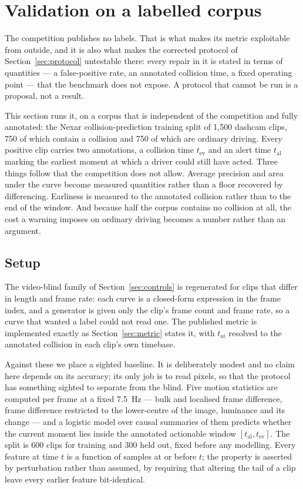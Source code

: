 \section{Validation on a labelled corpus}
\label{sec:nexar}

The competition publishes no labels. That is what makes its metric exploitable
from outside, and it is also what makes the corrected protocol of
Section~\ref{sec:protocol} untestable there: every repair in it is stated in
terms of quantities --- a false-positive rate, an annotated collision time, a
fixed operating point --- that the benchmark does not expose. A protocol that
cannot be run is a proposal, not a result.

This section runs it, on a corpus that is independent of the competition and
fully annotated: the Nexar collision-prediction training split of 1,500 dashcam
clips, 750 of which contain a collision and 750 of which are ordinary driving.
Every positive clip carries two annotations, a collision time $t_{\text{ev}}$
and an alert time $t_{\text{al}}$ marking the earliest moment at which a driver
could still have acted. Three things follow that the competition does not
allow. Average precision and area under the curve become measured quantities
rather than a floor recovered by differencing. Earliness is measured to the
annotated collision rather than to the end of the window. And because half the
corpus contains no collision at all, the cost a warning imposes on ordinary
driving becomes a number rather than an argument.

\subsection{Setup}

The video-blind family of Section~\ref{sec:controls} is regenerated for clips
that differ in length and frame rate: each curve is a closed-form expression in
the frame index, and a generator is given only the clip's frame count and frame
rate, so a curve that wanted a label could not read one. The published metric
is implemented exactly as Section~\ref{sec:metric} states it, with
$t_{ai}$ resolved to the annotated collision in each clip's own timebase.

Against these we place a sighted baseline. It is deliberately modest and no
claim here depends on its accuracy; its only job is to read pixels, so that the
protocol has something sighted to separate from the blind. Five motion
statistics are computed per frame at a fixed \SI{7.5}{\hertz} --- bulk and
localised frame difference, frame difference restricted to the lower-centre of
the image, luminance and its change --- and a logistic model over causal
summaries of them predicts whether the current moment lies inside the annotated
actionable window $[t_{\text{al}}, t_{\text{ev}}]$. The split is 600 clips for
training and 300 held out, fixed before any modelling. Every feature at time
$t$ is a function of samples at or before $t$; the property is asserted by
perturbation rather than assumed, by requiring that altering the tail of a clip
leave every earlier feature bit-identical.

